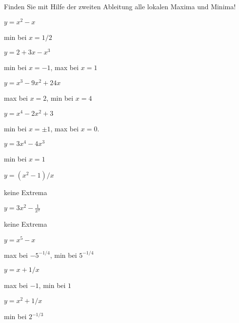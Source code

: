 \begin{exercises}
Finden Sie mit Hilfe der zweiten Ableitung alle lokalen Maxima und Minima!

\twocol
\begin{exercise} $y=x^2-x$ 
\begin{answer} min bei $x=1/2$
\end{answer}\end{exercise}

\begin{exercise} $y=2+3x-x^3$ 
\begin{answer} min bei $x=-1$, max bei $x=1$
\end{answer}\end{exercise}

\begin{exercise} $y=x^3-9x^2+24x$
\begin{answer} max bei $x=2$, min bei $x=4$
\end{answer}\end{exercise}

\begin{exercise} $y=x^4-2x^2+3$ 
\begin{answer} min bei $x=\pm 1$, max bei $x=0$.
\end{answer}\end{exercise}

\begin{exercise} $y=3x^4-4x^3$
\begin{answer} min bei $x=1$
\end{answer}\end{exercise}

\begin{exercise} $y=(x^2-1)/x$
\begin{answer} keine Extrema
\end{answer}\end{exercise}

\begin{exercise} $y=3x^2-\frac{1}{x^2}$ 
\begin{answer} keine Extrema
\end{answer}\end{exercise}

\begin{exercise} $y= x^5 - x$
\begin{answer} max bei $-5^{-1/4}$, min bei $5^{-1/4}$
\end{answer}\end{exercise}

\begin{exercise} $y = x+ 1/x$
\begin{answer} max bei $-1$, min bei $1$
\end{answer}\end{exercise}

\begin{exercise} $y = x^2+ 1/x$
\begin{answer} min bei $2^{-1/3}$
\end{answer}\end{exercise}


\endtwocol
\end{exercises}
